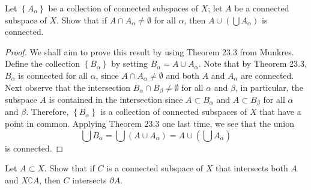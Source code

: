 \begin{problem}[Munkres \S23, Ex.\,3]
Let $\left\{A_\alpha\right\}$ be a collection of connected
subspaces of $X$; let $A$ be a connected subspace of $X$. Show
that if $A\cap A_\alpha\neq\emptyset$ for all $\alpha$, then
$A\cup\left(\bigcup A_\alpha\right)$ is connected.
\end{problem}
\begin{proof}
We shall aim to prove this result by using Theorem 23.3 from
Munkres. Define the collection $\left\{B_\alpha\right\}$ by
setting $B_\alpha=A\cup A_\alpha$. Note that by Theorem 23.3,
$B_\alpha$ is connected for all $\alpha$, since $A\cap
A_\alpha\neq\emptyset$ and both $A$ and $A_\alpha$ are
connected. Next observe that the intersection $B_\alpha\cap
B_\beta\neq\emptyset$ for all $\alpha$ and $\beta$, in
particular, the subspace $A$ is contained in the intersection
since $A\subset B_\alpha$ and $A\subset B_\beta$ for all $\alpha$
and $\beta$. Therefore, $\left\{B_\alpha\right\}$ is a collection
of connected subspaces of $X$ that have a point in
common. Applying Theorem 23.3 one last time, we see that the
union
\[
\bigcup B_\alpha
=
\bigcup\left(A\cup A_\alpha\right)
=
A\cup\left(\bigcup A_\alpha\right)
\]
is connected.
\end{proof}
\newpage
\begin{problem}[Munkres \S23, Ex.\,6]
Let $A\subset X$. Show that if $C$ is a connected subspace of $X$
that intersects both $A$ and $X\complement A$, then $C$ intersects
$\partial A$.
\end{problem}
